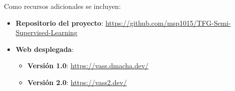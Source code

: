 Como recursos adicionales se incluyen:
\begin{itemize}
	\item \textbf{Repositorio del proyecto}: \url{https://github.com/msp1015/TFG-Semi-Supervised-Learning}
	\item \textbf{Web desplegada}: 
	\begin{itemize}
		\item \textbf{Versión 1.0}: \url{https://vass.dmacha.dev/}
		\item \textbf{Versión 2.0}: \url{https://vass2.dev/}
	\end{itemize}
\end{itemize}